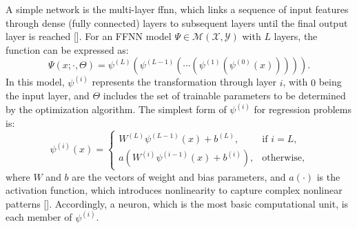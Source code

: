 A simple network is the multi-layer \ac{ffnn}, which links a sequence of input features through dense (fully connected) layers to subsequent layers until the final output layer is reached [\cite{rumelhart1986}]. For an FFNN model $\Psi \in \mathcal{M}\left ( \mathcal{X},\mathcal{Y} \right )$ with $L$ layers, the function can be expressed as:
%
\begin{equation}\label{eq-ffnn}
\Psi (x; \cdot, \Theta )= \psi^{(L)} \left( \psi^{(L-1)} \left(\cdots \left(\psi^{(1)} \left( \psi^{(0)} \left(x \right ) \right ) \right )\right )\right ).
\end{equation}
%
In this model, $\psi^{(i)}$ represents the transformation through layer $i$, with $0$ being the input layer, and $\Theta$ includes the set of trainable parameters to be determined by the optimization algorithm. The simplest form of $\psi^{(i)}$ for regression problems is:
%
\begin{equation}\label{eq-layer}
    \psi^{(i)}(x) = \begin{cases}
        W^{(L)}\psi^{(L-1)}(x) + b^{(L)}, & \text{if } i = L, \\ 
        a \left( W^{(i)}\psi^{(i-1)}(x) + b^{(i)} \right), & \text{otherwise},
    \end{cases}
\end{equation}
%
where $W$ and $b$ are the vectors of weight and bias parameters, and $a(\cdot)$ is the activation function, which introduces nonlinearity to capture complex nonlinear patterns [\cite{berner2022}]. Accordingly, a neuron, which is the most basic computational unit, is each member of $\psi^{(i)}$.

